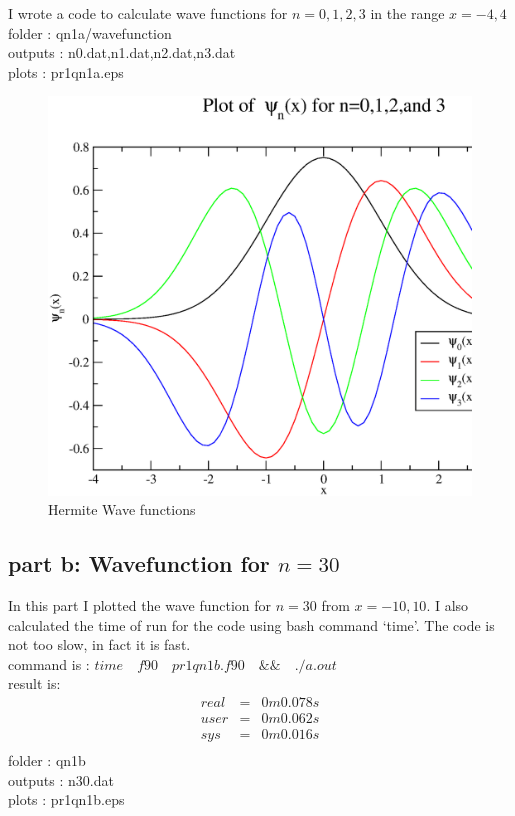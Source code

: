 \documentclass[11pt,a4paper,english]{article}
\newcommand{\no}{\nonumber}
\newcommand{\beqan}{\begin{eqnarray*}}
\newcommand{\eeqan}{\end{eqnarray*}}
\begin{document}
I wrote a code to calculate wave functions for $n=0,1,2,3$ in the range $x=-4,4$\\

    folder       : qn1a/wavefunction\\
	outputs      : n0.dat,n1.dat,n2.dat,n3.dat\\
	plots        : pr1qn1a.eps\\
	
	\begin{figure}[h!]
	\centering
	\includegraphics [scale=0.6]{pr1qn1a.eps}
	\caption{Hermite Wave functions }
	\end{figure}
	\clearpage
	
	
	
	\subsection{part b: Wavefunction for $n=30$ }
In this part I plotted the wave function for $n=30$ from $x=-10,10$. I also calculated the time of run for the code using bash command `time'.
The code is not too slow, in fact it is fast.\\
command is : $time\quad f90\quad pr1qn1b.f90\quad \&\&\quad ./a.out $\\
result is:
	\beqan
	real &=& 0m0.078s \no\\
	 user&=& 0m0.062s\no\\
	 sys&=& 0m0.016s\no\\
	\eeqan
    folder       : qn1b\\
	outputs      : n30.dat\\
	plots        : pr1qn1b.eps\\
		
\end{document}
